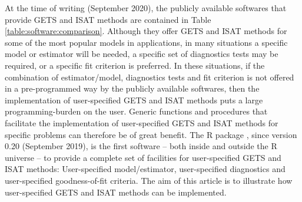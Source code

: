 At the time of writing (September 2020), the publicly available softwares that provide GETS and ISAT methods are contained in Table \ref{table:software:comparison}. Although they offer GETS and ISAT methods for some of the most popular models in applications, in many situations a specific model or estimator will be needed, a specific set of diagnostics tests may be required, or a specific fit criterion is preferred. In these situations, if the combination of estimator/model, diagnostics tests and fit criterion is not offered in a pre-programmed way by the publicly available softwares, then the implementation of user-specified GETS and ISAT methods puts a large programming-burden on the user. Generic functions and procedures that facilitate the implementation of user-specified GETS and ISAT methods for specific problems can therefore be of great benefit. The R package , since version 0.20 (September 2019), is the first software -- both inside and outside the R universe -- to provide a complete set of facilities for user-specified GETS and ISAT methods: User-specified model/estimator, user-specified diagnostics and user-specified goodness-of-fit criteria. The aim of this article is to illustrate how user-specified GETS and ISAT methods can be implemented.

